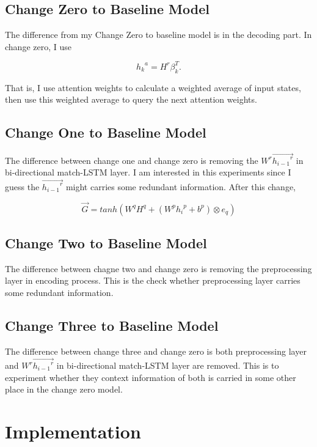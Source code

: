 \documentclass[modernstyle,12pt]{sjsuthesis}
\theoremstyle{definition}
\begin{document}
\section{Change Zero to Baseline Model} \label{sect:change_0}

The difference from my Change Zero to baseline model is in the decoding part. In change zero, I use

$${h_k}^a = H^r\beta _{k}^T.$$

That is, I use attention weights to calculate a weighted average of input states, then use this weighted average to query the next attention weights.

\section{Change One to Baseline Model}

The difference between change one and change zero is removing the $W^r\overrightarrow{{h_{i-1}}^r}$ in bi-directional match-LSTM layer. I am interested in this experiments since I guess the $\overrightarrow{{h_{i-1}}^r}$ might carries some redundant information. After this change,


$$\overrightarrow{G} = tanh(W^qH^q + (W^p{h_i}^p + b^p) \otimes e_q)$$


\section{Change Two to Baseline Model}

The difference between chagne two and change zero is removing the preprocessing layer in encoding process. This is the check whether preprocessing layer carries some redundant information.

\section{Change Three to Baseline Model}

The difference between change three and change zero is both preprocessing layer and $W^r\overrightarrow{{h_{i-1}}^r}$ in bi-directional match-LSTM layer are removed. This is to experiment whether they context information of both is carried in some other place in the change zero model.

\chapter{Implementation}
\end{document}
